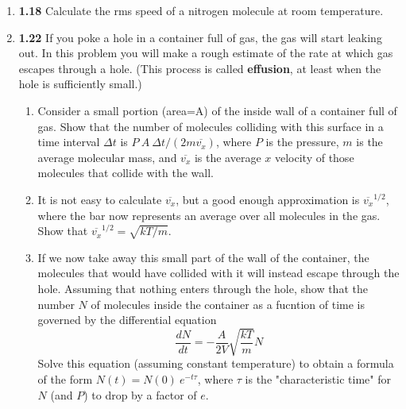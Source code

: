 \documentclass[fleqn]{article}
\begin{document}
\begin{enumerate}
\begin{enumerate}

    \end{enumerate}
    
    \item \textbf{1.18} Calculate the rms speed of a nitrogen molecule at room temperature.

    
    \item \textbf{1.22} If you poke a hole in a container full of gas, the gas will start leaking out. In this problem you 
    will make a rough estimate of the rate at which gas escapes through a hole. (This process is called \textbf{effusion}, at least when 
    the hole is sufficiently small.)

      \begin{enumerate}
        \item Consider a small portion (area=A) of the inside wall of a container full of gas. Show that the number of molecules colliding
        with this surface in a time interval $\Delta t$ is $P ~ A ~ \Delta t/(2m \overline{v_x})$, where $P$ is the pressure, $m$ is the 
        average molecular mass, and $\overline{v_x}$ is the average $x$ velocity of those molecules that collide with the wall.


        \item It is not easy to calculate $\overline{v_x}$, but a good enough approximation is $\overline{v_x}^{1/2}$, where the bar 
        now represents an average over all molecules in the gas. Show that $\overline{v_x}^{1/2}=\sqrt{kT/m}.$

          
        \item If we now take away this small part of the wall of the container, the molecules that would have collided with it will 
        instead escape through the hole. Assuming that nothing enters through the hole, show that the number $N$ of molecules inside
        the container as a fucntion of time is governed by the differential equation
        $$
          \dfrac{dN}{dt}=-\dfrac{A}{2V} \sqrt{\dfrac{kT}{m}} N
        $$
        Solve this equation (assuming constant temperature) to obtain a formula of the form $N(t)=N(0) ~ e^{-t\tau}$, where $\tau$
        is the "characteristic time" for $N$ (and $P$) to drop by a factor of $e$.


\end{enumerate}
\end{enumerate}
\end{document}
